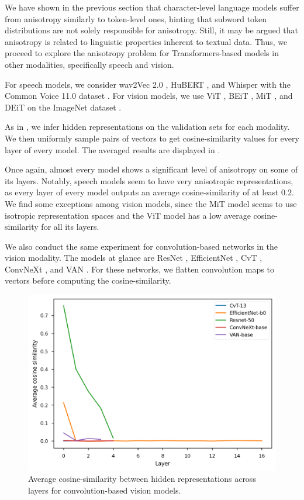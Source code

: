 We have shown in the previous section that character-level language models suffer from anisotropy similarly to token-level ones, hinting that subword token distributions are not solely responsible for anisotropy. Still, it may be argued that anisotropy is related to linguistic properties inherent to textual data. Thus, we proceed to explore the anisotropy problem for Transformers-based models in other modalities, specifically speech and vision.

For speech models, we consider wav2Vec 2.0 \citep{wav2vec}, HuBERT \citep{HuBERT}, and Whisper \citep{radford2022whisper} with the Common Voice 11.0 dataset \citep{commonvoice:2020}. For vision models, we use ViT \citep{Wu2020VisualTT}, BEiT \citep{beit-2021}, MiT \citep{segformer21}, and DEiT \citep{pmlr-v139-touvron21a} on the ImageNet dataset \citep{imagenet15russakovsky}.

As in , we infer hidden representations on the validation sets for each modality. We then uniformly sample pairs of vectors to get cosine-similarity values for every layer of every model. The averaged results are displayed in .

Once again, almost every model shows a significant level of anisotropy on some of its layers. Notably, speech models seem to have very anisotropic representations, as every layer of every model outputs an average cosine-similarity of at least $0.2$. We find some exceptions among vision models, since the MiT model seems to use isotropic representation spaces and the ViT model has a low average cosine-similarity for all its layers.

We also conduct the same experiment for convolution-based networks in the vision modality. The models at glance are ResNet \citep{he2016deep}, EfficientNet \citep{Tan2019EfficientNetRM}, CvT \citep{wu2021cvt}, ConvNeXt \citep{liu2022convnet}, and VAN \citep{guo2022visual}. For these networks, we flatten convolution maps to vectors before computing the cosine-similarity.

\begin{figure}[ht]
    \centering
    \includegraphics[width=0.5\linewidth]{sources/part_1/anisotropy/imgs/cosine_cnn_imagenet.png}
    \caption{Average cosine-similarity between hidden representations across layers for convolution-based vision models.}
    \label{fig:convbased}
\end{figure}

